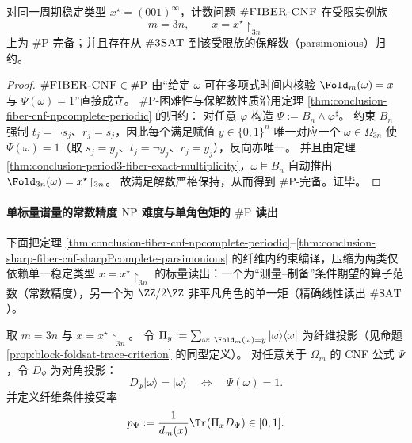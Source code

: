 \begin{theorem}\label{thm:conclusion-sharp-fiber-cnf-sharpPcomplete-parsimonious}
对同一周期稳定类型 \(x^\star=(001)^\infty\)，计数问题 \(\#\text{\normalfont\textsc{FIBER-CNF}}\) 在受限实例族
\[
m=3n,\qquad x=x^\star\!\upharpoonright_{3n}
\]
上为 \(\#\mathrm{P}\)-完备；并且存在从 \(\#\text{\normalfont\textsc{3SAT}}\) 到该受限族的保解数（parsimonious）归约。
\end{theorem}

\begin{proof}
\(\#\textsc{FIBER-CNF}\in\#\mathrm{P}\) 由“给定 \(\omega\) 可在多项式时间内核验 \(\Fold_m(\omega)=x\) 与 \(\Psi(\omega)=1\)”直接成立。
\(\#\mathrm{P}\)-困难性与保解数性质沿用定理 \ref{thm:conclusion-fiber-cnf-npcomplete-periodic} 的归约：
对任意 \(\varphi\) 构造 \(\Psi:=B_n\wedge\varphi^\sharp\)。
约束 \(B_n\) 强制 \(t_j=\neg s_j\)、\(r_j=s_j\)，因此每个满足赋值 \(y\in\{0,1\}^n\) 唯一对应一个 \(\omega\in\Omega_{3n}\) 使 \(\Psi(\omega)=1\)（取 \(s_j=y_j\)、\(t_j=\neg y_j\)、\(r_j=y_j\)），反向亦唯一。
并且由定理 \ref{thm:conclusion-period3-fiber-exact-multiplicity}，\(\omega\models B_n\) 自动推出 \(\Fold_{3n}(\omega)=x^\star\!\upharpoonright_{3n}\)。
故满足解数严格保持，从而得到 \(\#\mathrm{P}\)-完备。证毕。
\end{proof}

\paragraph{单标量谱量的常数精度 \(\mathrm{NP}\) 难度与单角色矩的 \(\#\mathrm{P}\) 读出}
下面把定理 \ref{thm:conclusion-fiber-cnf-npcomplete-periodic}--\ref{thm:conclusion-sharp-fiber-cnf-sharpPcomplete-parsimonious} 的纤维内约束编译，压缩为两类仅依赖单一稳定类型 \(x=x^\star\!\upharpoonright_{3n}\) 的标量读出：一个为“测量--制备”条件期望的算子范数（常数精度），另一个为 \(\ZZ/2\ZZ\) 非平凡角色的单一矩（精确线性读出 \(\#\mathrm{SAT}\)）。

\begin{definition}[固定周期纤维上的验证投影与接受率]\label{def:conclusion-periodic-fiber-verifier}
取 \(m=3n\) 与 \(x=x^\star\!\upharpoonright_{3n}\)。
令 \(\Pi_y:=\sum_{\omega:\ \Fold_m(\omega)=y}|\omega\rangle\langle\omega|\) 为纤维投影（见命题 \ref{prop:block-foldsat-trace-criterion} 的同型定义）。
对任意关于 \(\Omega_m\) 的 CNF 公式 \(\Psi\)，令 \(D_\Psi\) 为对角投影：
\[
D_\Psi|\omega\rangle=|\omega\rangle
\quad\Longleftrightarrow\quad
\Psi(\omega)=1.
\]
并定义纤维条件接受率
\[
p_\Psi:=\frac{1}{d_m(x)}\Tr(\Pi_xD_\Psi)\in[0,1].
\]
\end{definition}

